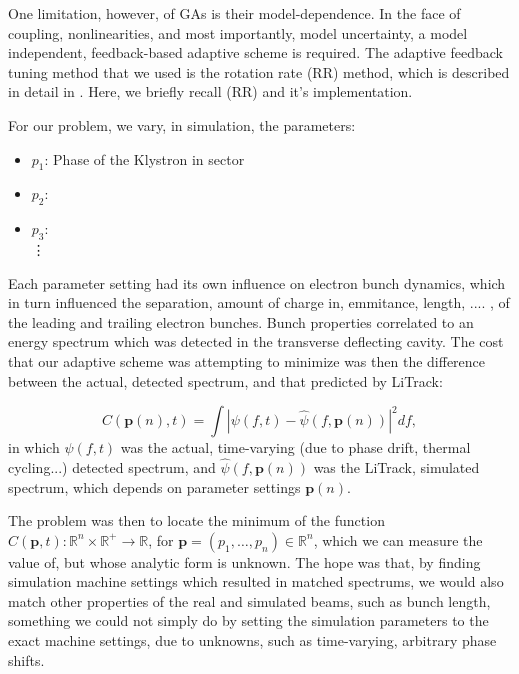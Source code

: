 \documentclass[%
twocolumn,
showpacs,preprintnumbers,
 aps,
prstab,
]{revtex4-1}
\begin{document}
One limitation, however, of GAs is their model-dependence. In the face of coupling, nonlinearities, and most importantly, model uncertainty, a model independent, feedback-based adaptive scheme is required. The adaptive feedback tuning method that we used is the rotation rate (RR) method, which is described in detail in \cite{ref-stab-sch}. Here, we briefly recall (RR) and it's implementation.

For our problem, we vary, in simulation, the parameters:
\begin{itemize}
	\item $p_1$: Phase of the Klystron in sector \cite{?}
	\item $p_2$: \cite{?}
	\item $p_3$: \cite{?} \\ \vdots
\end{itemize}

Each parameter setting had its own influence on electron bunch dynamics, which in turn influenced the separation, amount of charge in, emmitance, length, .... , of the leading and trailing electron bunches. Bunch properties correlated to an energy spectrum which was detected in the transverse deflecting cavity. The cost that our adaptive scheme was attempting to minimize was then the difference between the actual, detected spectrum, and that predicted by LiTrack:

\begin{equation}
	C(\mathbf{p}(n),t) = \int \left | \psi(f,t) - \hat{\psi}(f,\mathbf{p}(n)) \right |^2 df,
\end{equation}
in which $\psi(f,t)$ was the actual, time-varying (due to phase drift, thermal cycling...) detected spectrum, and $\hat{\psi}(f,\mathbf{p}(n))$ was the LiTrack, simulated spectrum, which depends on parameter settings $\mathbf{p}(n)$.


The problem was then to locate the minimum of the function $C(\mathbf{p},t):\mathbb{R}^n\times \mathbb{R}^+ \rightarrow \mathbb{R}$, for $\mathbf{p} = (p_1, \dots, p_n) \in \mathbb{R}^n$, which we can measure the value of, but whose analytic form is unknown. The hope was that, by finding simulation machine settings which resulted in matched spectrums, we would also match other properties of the real and simulated beams, such as bunch length, something we could not simply do by setting the simulation parameters to the exact machine settings, due to unknowns, such as time-varying, arbitrary phase shifts.
\end{document}
